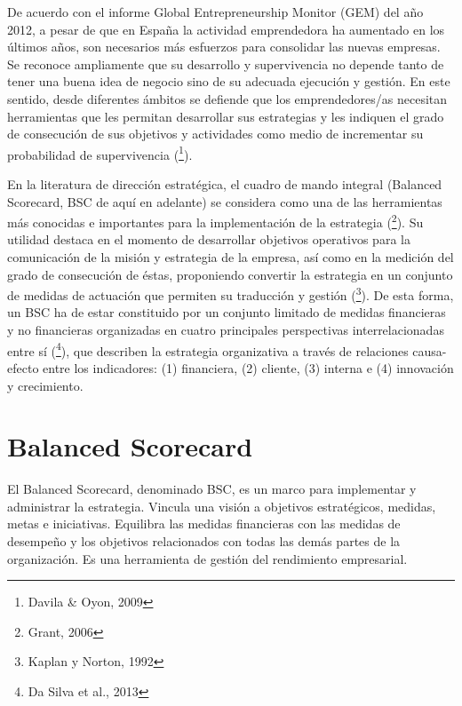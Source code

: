 \item{De acuerdo con el informe Global Entrepreneurship Monitor (GEM) del año 2012, a pesar de que en España la actividad emprendedora ha aumentado en los últimos años, son necesarios más esfuerzos para consolidar las nuevas empresas. Se reconoce ampliamente que su desarrollo y supervivencia no depende tanto de tener una buena idea de negocio sino de su adecuada ejecución y gestión. En este sentido, desde diferentes ámbitos se defiende que los emprendedores/as necesitan herramientas que les permitan desarrollar sus estrategias y les indiquen el grado de consecución de sus objetivos y actividades como medio de incrementar su probabilidad de supervivencia (\footnote{Davila & Oyon, 2009}).}

\item{En la literatura de dirección estratégica, el cuadro de mando integral (Balanced Scorecard, BSC de aquí en adelante) se considera como una de las herramientas más conocidas e importantes para la implementación de la estrategia (\footnote{Grant, 2006}). Su utilidad destaca en el momento de desarrollar objetivos operativos para la comunicación de la misión y estrategia de la empresa, así como en la medición del grado de consecución de éstas, proponiendo convertir la estrategia en un conjunto de medidas de actuación que permiten su traducción y gestión (\footnote{Kaplan y Norton, 1992}). De esta forma, un BSC ha de estar constituido por un conjunto limitado de medidas financieras y no financieras organizadas en cuatro principales perspectivas interrelacionadas entre sí (\footnote{Da Silva et al., 2013}), que describen la estrategia organizativa a través de relaciones causa-efecto entre los indicadores: (1) financiera, (2) cliente, (3) interna e (4) innovación y crecimiento.}

\section{Balanced Scorecard}

\item{El Balanced Scorecard, denominado BSC, es un marco para implementar y administrar la estrategia. Vincula una visión a objetivos estratégicos, medidas, metas e iniciativas. Equilibra las medidas financieras con las medidas de desempeño y los objetivos relacionados con todas las demás partes de la organización. Es una herramienta de gestión del rendimiento empresarial.}

